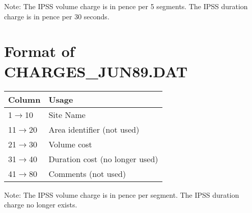 Note: The IPSS volume charge is in pence per 5 segments.
      The IPSS duration charge is in pence per 30 seconds.


\section{Format of CHARGES\_\/JUN89.DAT }
\begin{table}[htb]
\begin{center}
\begin{tabular} {||l|l||}
\hline
Column   & Usage   \\
\hline
 1$\rightarrow$10        &          Site Name                     \\
11$\rightarrow$20        &          Area identifier (not used)    \\
21$\rightarrow$30        &          Volume cost                   \\
31$\rightarrow$40        &          Duration cost (no longer used)\\
41$\rightarrow$80        &          Comments (not used)           \\
\hline
\end{tabular}
\end{center} 
\end{table}

\noindent Note: The IPSS volume charge is in pence per segment.
      The IPSS duration charge no longer exists.


 
